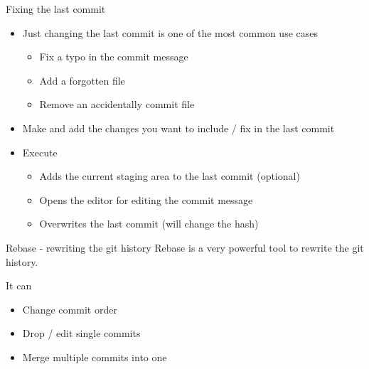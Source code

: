 \begin{frame}[c, fragile]{Fixing the last commit}
  \begin{itemize}
    \item Just changing the last commit is one of the most common use cases
      \begin{itemize}
        \item Fix a typo in the commit message
        \item Add a forgotten file
        \item Remove an accidentally commit file
      \end{itemize}
    \item Make and add the changes you want to include / fix in the last commit
    \item Execute
      \begin{itemize}
        \item Adds the current staging area to the last commit (optional)
        \item Opens the editor for editing the commit message
        \item Overwrites the last commit (will change the hash)
      \end{itemize}
  \end{itemize}
\end{frame}

\begin{frame}[c]{Rebase - rewriting the git history}
  Rebase is a very powerful tool to rewrite the git history.

  It can
  \begin{itemize}
    \item Change commit order
    \item Drop / edit single commits
    \item Merge multiple commits into one
  \end{itemize}
\end{frame}


